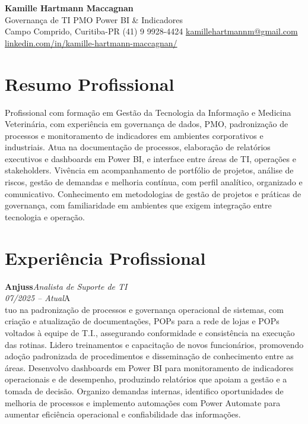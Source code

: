 \documentclass[11pt,a4paper]{article}
\newcommand{\cvrole}[4]{%
  \vspace{4pt}%
  {\bfseries\color{accentcolor}#1}\hfill{\itshape #2}\\[-2pt]%
  {\itshape #3}\hfill #4\\[6pt]%
}
\begin{document}
\begin{center}
  {\fontsize{20}{24}\selectfont\bfseries Kamille Hartmann Maccagnan}\\[8pt]
  {\large Governança de TI \textbar{} PMO \textbar{} Power BI \& Indicadores}\\[10pt]
  Campo Comprido, Curitiba-PR \enspace\textbullet\enspace (41) 9 9928-4424 \enspace\textbullet\enspace
  \href{mailto:kamillehartmannm@gmail.com}{kamillehartmannm@gmail.com}\\[3pt]
  \href{https://linkedin.com/in/kamille-hartmann-maccagnan/}{linkedin.com/in/kamille-hartmann-maccagnan/}
\end{center}

\vspace{6pt}

\section{Resumo Profissional}

Profissional com formação em Gestão da Tecnologia da Informação e Medicina Veterinária, com experiência em governança de dados, PMO, padronização de processos e monitoramento de indicadores em ambientes corporativos e industriais. Atua na documentação de processos, elaboração de relatórios executivos e dashboards em Power BI, e interface entre áreas de TI, operações e stakeholders. Vivência em acompanhamento de portfólio de projetos, análise de riscos, gestão de demandas e melhoria contínua, com perfil analítico, organizado e comunicativo. Conhecimento em metodologias de gestão de projetos e práticas de governança, com familiaridade em ambientes que exigem integração entre tecnologia e operação.

\section{Experiência Profissional}

\cvrole{Anjuss}{Analista de Suporte de TI}{07/2025 -- Atual}

Atuo na padronização de processos e governança operacional de sistemas, com criação e atualização de documentações, POPs para a rede de lojas e POPs voltados à equipe de T.I., assegurando conformidade e consistência na execução das rotinas. Lidero treinamentos e capacitação de novos funcionários, promovendo adoção padronizada de procedimentos e disseminação de conhecimento entre as áreas. Desenvolvo dashboards em Power BI para monitoramento de indicadores operacionais e de desempenho, produzindo relatórios que apoiam a gestão e a tomada de decisão. Organizo demandas internas, identifico oportunidades de melhoria de processos e implemento automações com Power Automate para aumentar eficiência operacional e confiabilidade das informações.
\end{document}
